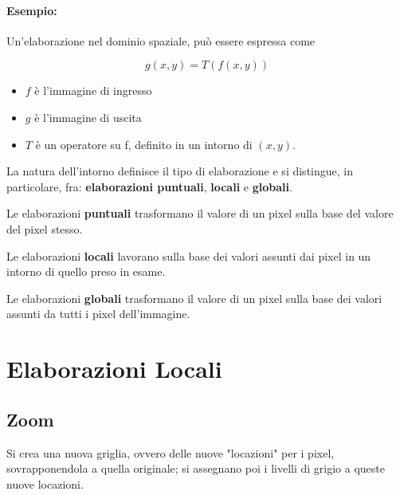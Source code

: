 \paragraph{Esempio:}

Un'elaborazione nel dominio spaziale, può essere
espressa come

$$
    g(x , y) = T(f (x , y))
$$

\begin{itemize}
    \item $f$ è l'immagine di ingresso
    \item $g$ è l'immagine di uscita
    \item $T$ è un operatore su f, definito in un intorno di $(x , y)$.
\end{itemize}

La natura dell'intorno definisce il tipo di elaborazione e si distingue,
in particolare, fra: \textbf{elaborazioni puntuali}, \textbf{locali} e \textbf{globali}.

\begin{definition}
    Le elaborazioni \textbf{puntuali} trasformano il valore di un pixel sulla
    base del valore del pixel stesso.
\end{definition}

\begin{definition}
    Le elaborazioni \textbf{locali} lavorano sulla base dei valori assunti dai pixel in
    un intorno di quello preso in esame.
\end{definition}

\begin{definition}
    Le elaborazioni \textbf{globali} trasformano il valore di un pixel sulla
    base dei valori assunti da tutti i pixel dell'immagine.
\end{definition}

\section{Elaborazioni Locali}

\subsection{Zoom}

Si crea una nuova griglia, ovvero delle nuove "locazioni" per i pixel,
sovrapponendola a quella originale; si assegnano poi i livelli di grigio a
queste nuove locazioni.

